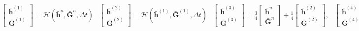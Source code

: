 \documentclass[SingleSpace,12pt]{Serre_ASCE}
\begin{document}
%
\begin{linenomath*}
\begin{subequations}
\begin{gather}\label{eq:SSPRK31}
\left[\begin{array}{c}
 \boldsymbol{\bar{h}}^{\left(1\right)} \\
 \boldsymbol{\bar{G}}^{\left(1\right)} \end{array}\right] = \mathcal{H}\left(\boldsymbol{\bar{h}}^{n},\boldsymbol{\bar{G}}^{n},\Delta t\right)
\end{gather}
\begin{gather}\label{eq:SSPRK32}
\left[\begin{array}{c}
 \boldsymbol{\bar{h}}^{\left(2\right)} \\
 \boldsymbol{\bar{G}}^{\left(2\right)} \end{array}\right] = \mathcal{H}\left(\boldsymbol{\bar{h}}^{\left(1\right)},\boldsymbol{\bar{G}}^{\left(1\right)},\Delta t\right)
\end{gather}
\begin{gather}\label{eq:SSPRK33}
\left[\begin{array}{c}
 \boldsymbol{\bar{h}}^{\left(3\right)} \\
 \boldsymbol{\bar{G}}^{\left(3\right)} \end{array}\right]= \frac{3}{4}\left[\begin{array}{c}
  \boldsymbol{\bar{h}}^{n} \\
  \boldsymbol{\bar{G}}^{n} \end{array}\right] + \frac{1}{4}\left[\begin{array}{c}
   \boldsymbol{\bar{h}}^{\left(2\right)} \\
   \boldsymbol{\bar{G}}^{\left(2\right)} \end{array}\right] ,
\end{gather}
\begin{gather}\label{eq:SSPRK34}
\left[\begin{array}{c}
 \boldsymbol{\bar{h}}^{\left(4\right)} \\
 \boldsymbol{\bar{G}}^{\left(4\right)} \end{array}\right] = \mathcal{H}\left(\boldsymbol{\bar{h}}^{\left(3\right)},\boldsymbol{\bar{G}}^{\left(3\right)},\Delta t\right)
\end{gather}
\begin{gather}\label{eq:SSPRK35}
\left[\begin{array}{c}
 \boldsymbol{\bar{h}}^{\left(n+1\right)} \\

\end{array}
\end{gather}
\end{subequations}
\end{linenomath*}
\end{document}
